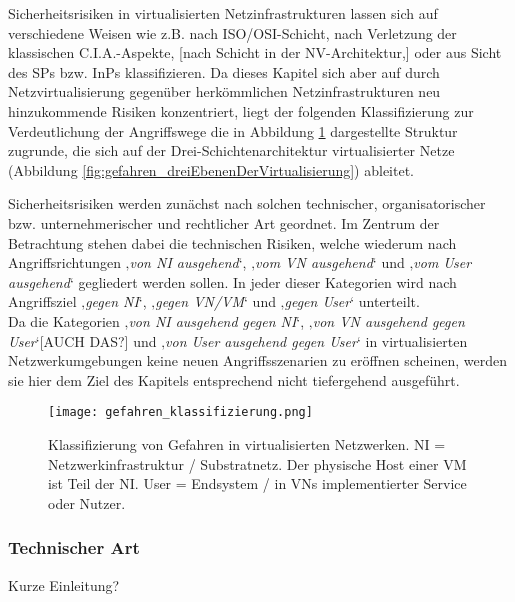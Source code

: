 Sicherheitsrisiken in virtualisierten Netzinfrastrukturen lassen sich auf verschiedene Weisen wie z.B. nach ISO/OSI-Schicht, nach Verletzung der klassischen C.I.A.-Aspekte, [nach Schicht in der NV-Architektur,] oder aus Sicht des SPs bzw. InPs klassifizieren. Da dieses Kapitel sich aber auf durch Netzvirtualisierung gegenüber herkömmlichen Netzinfrastrukturen neu hinzukommende Risiken konzentriert, liegt der folgenden Klassifizierung zur Verdeutlichung der Angriffswege die in Abbildung \ref{fig:gefahren_klassifizierung} dargestellte Struktur zugrunde, die sich auf der Drei-Schichtenarchitektur virtualisierter Netze (Abbildung \ref{fig:gefahren_dreiEbenenDerVirtualisierung}) ableitet.

Sicherheitsrisiken werden zunächst nach solchen technischer, organisatorischer bzw. unternehmerischer und rechtlicher Art geordnet. Im Zentrum der Betrachtung stehen dabei die technischen Risiken, welche wiederum nach Angriffsrichtungen ‚\textit{von NI ausgehend}‘, ‚\textit{vom VN ausgehend}‘ und ‚\textit{vom User ausgehend}‘ gegliedert werden sollen. In jeder dieser Kategorien wird nach Angriffsziel ‚\textit{gegen NI}‘, ‚\textit{gegen VN/VM}‘ und ‚\textit{gegen User}‘ unterteilt. \\
Da die Kategorien ‚\textit{von NI ausgehend gegen NI}‘, ‚\textit{von VN ausgehend gegen User}‘[AUCH DAS?] und ‚\textit{von User ausgehend gegen User}‘ in virtualisierten Netzwerkumgebungen keine neuen Angriffsszenarien zu eröffnen scheinen, werden sie hier dem Ziel des Kapitels entsprechend nicht tiefergehend ausgeführt. 


\begin{figure}[htb]
	\begin{center}
	\texttt{[image: gefahren\_klassifizierung.png]}
	\caption{\label{fig:gefahren_klassifizierung} Klassifizierung von Gefahren in virtualisierten Netzwerken. 
		\newline NI = Netzwerkinfrastruktur / Substratnetz. Der physische Host einer VM ist Teil der NI.
		\newline User = Endsystem / in VNs implementierter Service oder Nutzer.}
	\end{center}
\end{figure}





\subsubsection{Technischer Art}
\label{subsubsec:gefahren_virt_technisch}
Kurze Einleitung?


